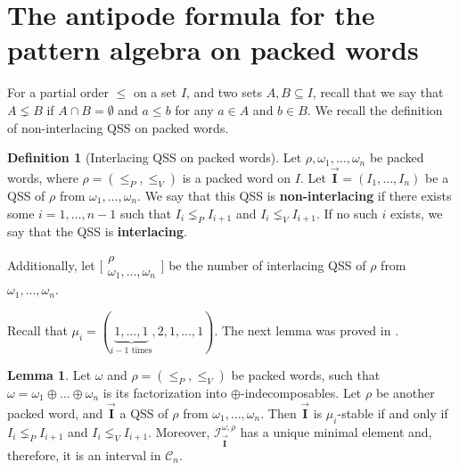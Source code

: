 \documentclass[submission]{FPSAC2023}
\theoremstyle{definition}
\newtheorem{lm}[thm]{Lemma}
\newtheorem{defin}[thm]{Definition}
\newcommand{\III}{\vec{\mathbf{I}}}
\begin{document}
\section{The antipode formula for the pattern algebra on packed words\label{sec:formula_packed}}
For a partial order $\leq$ on a set $I$, and two sets $A, B \subseteq I$, recall that we say that $A \lneq B$ if $A\cap B = \emptyset$ and $a \leq b$ for any $a \in A$ and $b \in B$.
We recall the definition of non-interlacing QSS on packed words.

\begin{defin}[Interlacing QSS on packed words]
Let $\rho, \omega_1, \dots, \omega_n$ be packed words, where $\rho = (\leq_P, \leq_V)$ is a packed word on $I$.
Let $\III = (I_1, \dots, I_n)$ be a QSS of $\rho$ from $\omega_1, \dots, \omega_n$.
We say that this QSS is \textbf{non-interlacing} if there exists some $i = 1, \dots, n-1$ such that $I_i \lneq_P I_{i+1}$ and $I_i \lneq_V I_{i+1}$.
If no such $i$ exists, we say that the QSS is \textbf{interlacing}.\vspace{.05in}


Additionally, let $ \bigl[\!\begin{smallmatrix} \rho  \\ \omega_1, \dots, \omega_n \end{smallmatrix}\!\bigr]$ be the number of interlacing QSS of $\rho$ from $\omega_1, \dots, \omega_n$.
\end{defin}

Recall that $\mu_i = (\underbrace{1, \dots , 1}_\text{$i-1$ times}, 2, 1, \dots, 1)$. The next lemma was proved in \cite[Lemma 7.2 and Lemma 7.3]{PV2022}.


\begin{lm}\label{lm:QSSpackedWords}
Let $\omega$ and $\rho = (\leq_P, \leq_V)$ be packed words, such that $\omega = \omega_1 \oplus \dots \oplus \omega_n$ is its factorization into $\oplus$-indecomposables. Let $\rho$ be another packed word, and $\III$ a QSS of $\rho$ from $\omega_1, \dots , \omega_n$. Then $\III$ is $\mu_i$-stable if and only if $I_i \lneq_P I_{i+1}$ and $I_i \lneq_V I_{i+1}$. Moreover, $\mathcal I^{\omega, \rho}_{\III}$ has a unique minimal element and, therefore, it is an interval in $\mathcal C_n$.
\end{lm}
\end{document}
